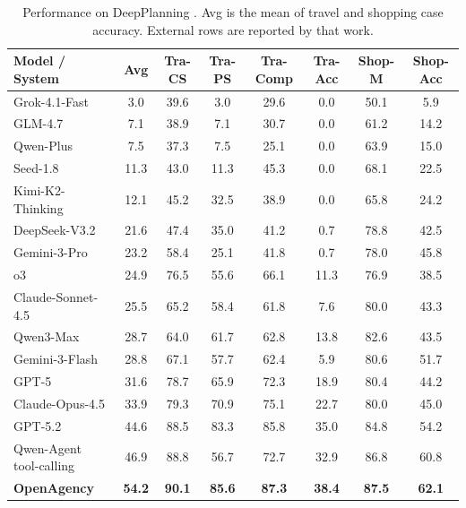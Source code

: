 \documentclass{article} %
\begin{document}
\begin{table}[t]
\caption{Performance on DeepPlanning \citep{zhang2026deepplanning}. Avg is the mean of travel and shopping case accuracy. External rows are reported by that work.}
\label{tab:dp}
\begin{center}
\small
\setlength{\tabcolsep}{2pt}
\begin{tabular}{lccccccc}
\toprule
\textbf{Model / System} & \textbf{Avg} & \textbf{Tra-CS} & \textbf{Tra-PS} & \textbf{Tra-Comp} & \textbf{Tra-Acc} & \textbf{Shop-M} & \textbf{Shop-Acc} \\
\midrule
Grok-4.1-Fast & 3.0 & 39.6 & 3.0 & 29.6 & 0.0 & 50.1 & 5.9 \\
GLM-4.7 & 7.1 & 38.9 & 7.1 & 30.7 & 0.0 & 61.2 & 14.2 \\
Qwen-Plus & 7.5 & 37.3 & 7.5 & 25.1 & 0.0 & 63.9 & 15.0 \\
Seed-1.8 & 11.3 & 43.0 & 11.3 & 45.3 & 0.0 & 68.1 & 22.5 \\
Kimi-K2-Thinking & 12.1 & 45.2 & 32.5 & 38.9 & 0.0 & 65.8 & 24.2 \\
DeepSeek-V3.2 & 21.6 & 47.4 & 35.0 & 41.2 & 0.7 & 78.8 & 42.5 \\
Gemini-3-Pro & 23.2 & 58.4 & 25.1 & 41.8 & 0.7 & 78.0 & 45.8 \\
o3 & 24.9 & 76.5 & 55.6 & 66.1 & 11.3 & 76.9 & 38.5 \\
Claude-Sonnet-4.5 & 25.5 & 65.2 & 58.4 & 61.8 & 7.6 & 80.0 & 43.3 \\
Qwen3-Max & 28.7 & 64.0 & 61.7 & 62.8 & 13.8 & 82.6 & 43.5 \\
Gemini-3-Flash & 28.8 & 67.1 & 57.7 & 62.4 & 5.9 & 80.6 & 51.7 \\
GPT-5 & 31.6 & 78.7 & 65.9 & 72.3 & 18.9 & 80.4 & 44.2 \\
Claude-Opus-4.5 & 33.9 & 79.3 & 70.9 & 75.1 & 22.7 & 80.0 & 45.0 \\
GPT-5.2 & 44.6 & 88.5 & 83.3 & 85.8 & 35.0 & 84.8 & 54.2 \\
\midrule
Qwen-Agent tool-calling & 46.9 & 88.8 & 56.7 & 72.7 & 32.9 & 86.8 & 60.8 \\
\rowcolor{gray!12}
\textbf{OpenAgency} & \textbf{54.2} & \textbf{90.1} & \textbf{85.6} & \textbf{87.3} & \textbf{38.4} & \textbf{87.5} & \textbf{62.1} \\
\bottomrule
\end{tabular}
\end{center}
\end{table}
\end{document}
